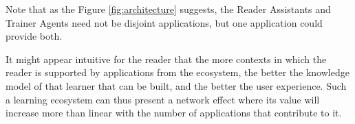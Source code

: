 \begin{itemize}


	
\end{itemize}

Note that as the Figure \ref{fig:architecture} suggests, the Reader Assistants and Trainer Agents need not be disjoint applications, but one application could provide both.

It might appear intuitive for the reader that the more contexts in which the reader is supported by applications from the ecosystem, the better the knowledge model of that learner that can be built, and the better the user experience. Such a learning ecosystem can thus present a network effect where its value will increase more than linear with the number of applications that contribute to it.



